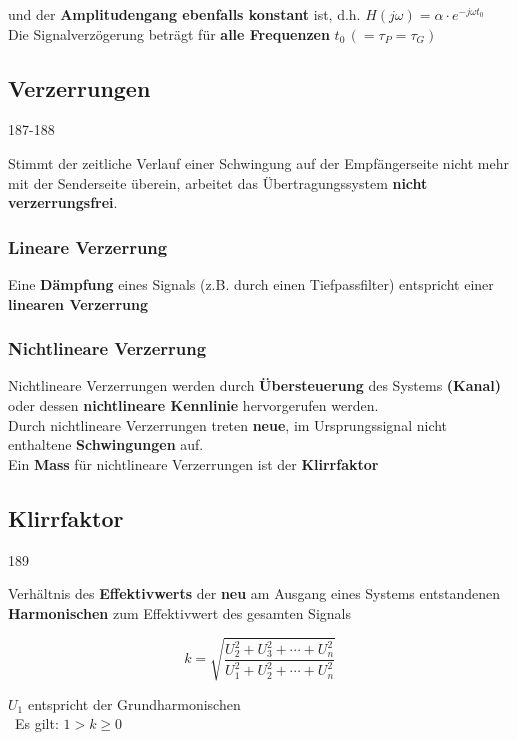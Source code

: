 und der \textbf{Amplitudengang ebenfalls konstant} ist, d.h. $H(j \omega) = \alpha \cdot e^{-j \omega t_0}$ \\
Die Signalverzögerung beträgt für \textbf{alle Frequenzen} $t_0 \, (= \tau_P = \tau_G) $ 


\subsection{Verzerrungen}{187-188}

Stimmt der zeitliche Verlauf einer Schwingung auf der Empfängerseite nicht mehr mit der Senderseite überein, arbeitet das
Übertragungssystem \textbf{nicht verzerrungsfrei}.


\subsubsection{Lineare Verzerrung}
Eine \textbf{Dämpfung} eines Signals (z.B. durch einen Tiefpassfilter) entspricht einer \textbf{linearen Verzerrung}


\subsubsection{Nichtlineare Verzerrung}
Nichtlineare Verzerrungen werden durch \textbf{Übersteuerung} des Systems \textbf{(Kanal)} oder dessen
\textbf{nichtlineare Kennlinie} hervorgerufen werden. \\
Durch nichtlineare Verzerrungen treten \textbf{neue}, im Ursprungssignal nicht enthaltene \textbf{Schwingungen} auf.\\
Ein \textbf{Mass} für nichtlineare Verzerrungen ist der \textbf{Klirrfaktor}


\subsection{Klirrfaktor}{189}

Verhältnis des \textbf{Effektivwerts} der \textbf{neu} am Ausgang eines Systems entstandenen \textbf{Harmonischen} zum 
Effektivwert des gesamten Signals

\begin{minipage}[b]{0.48\columnwidth}
    $$ \boxed{ k = \sqrt{\frac{U_2^2 + U_3^2 + \cdots + U_n^2}{U_1^2 + U_2^2 + \cdots + U_n^2}}} $$
\end{minipage}
\hfill
\begin{minipage}[c]{0.48\columnwidth}
    \raggedright%
    $U_1$ entspricht der Grundharmonischen\\
    \textrightarrow\ Es gilt: $1 > k \geq 0$
\end{minipage}


